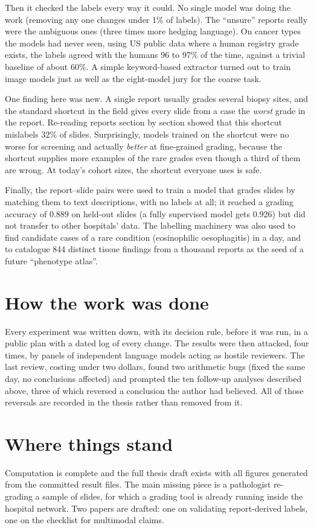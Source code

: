 \documentclass[11pt,a4paper]{article}
\begin{document}
Then it checked the labels every way it could. No single model was doing the work (removing any one changes under 1\% of labels). The ``unsure'' reports really were the ambiguous ones (three times more hedging language). On cancer types the models had never seen, using US public data where a human registry grade exists, the labels agreed with the humans 96 to 97\% of the time, against a trivial baseline of about 60\%. A simple keyword-based extractor turned out to train image models just as well as the eight-model jury for the coarse task.

One finding here was new. A single report usually grades several biopsy sites, and the standard shortcut in the field gives every slide from a case the \emph{worst} grade in the report. Re-reading reports section by section showed that this shortcut mislabels 32\% of slides. Surprisingly, models trained on the shortcut were no worse for screening and actually \emph{better} at fine-grained grading, because the shortcut supplies more examples of the rare grades even though a third of them are wrong. At today's cohort sizes, the shortcut everyone uses is safe.

Finally, the report--slide pairs were used to train a model that grades slides by matching them to text descriptions, with no labels at all; it reached a grading accuracy of 0.889 on held-out slides (a fully supervised model gets 0.926) but did not transfer to other hospitals' data. The labelling machinery was also used to find candidate cases of a rare condition (eosinophilic oesophagitis) in a day, and to catalogue 844 distinct tissue findings from a thousand reports as the seed of a future ``phenotype atlas''.

\section*{How the work was done}
Every experiment was written down, with its decision rule, before it was run, in a public plan with a dated log of every change. The results were then attacked, four times, by panels of independent language models acting as hostile reviewers. The last review, costing under two dollars, found two arithmetic bugs (fixed the same day, no conclusions affected) and prompted the ten follow-up analyses described above, three of which reversed a conclusion the author had believed. All of those reversals are recorded in the thesis rather than removed from it.

\section*{Where things stand}
Computation is complete and the full thesis draft exists with all figures generated from the committed result files. The main missing piece is a pathologist re-grading a sample of slides, for which a grading tool is already running inside the hospital network. Two papers are drafted: one on validating report-derived labels, one on the checklist for multimodal claims.
\end{document}
